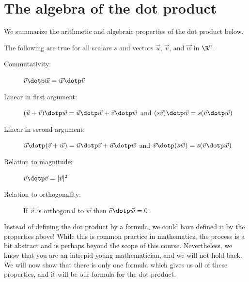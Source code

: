 \documentclass{ximera}
\begin{document}
\begin{example}
\begin{explanation}
\begin{image}
    \end{image}
\end{explanation}
\end{example}






\section{The algebra of the dot product}

We summarize the arithmetic and algebraic properties of the dot
product below.
\begin{theorem}
  The following are true for all scalars $s$ and vectors
  $\vec{u}$, $\vec{v}$, and $\vec{w}$ in $\R^n$.
  \begin{description}
  \item[Commutativity:] $\vec{v} \dotp \vec{w} = \vec{w} \dotp
    \vec{v}$
  \item[Linear in first argument:] $(\vec{u}+\vec{v})\dotp \vec{w} = \vec{u}\dotp \vec{w} +
    \vec{v}\dotp \vec{w}$ and $(s\vec{v})\dotp \vec{w} = s(\vec{v}
    \dotp \vec{w})$
  \item[Linear in second argument:] $\vec{u} \dotp (\vec{v}+\vec{w}) = \vec{u}\dotp \vec{v}+
    \vec{u}\dotp \vec{w}$ and $\vec{v} \dotp (s\vec{w}) = s(\vec{v}
    \dotp \vec{w})$
  \item[Relation to magnitude:] $\vec{v} \dotp \vec{v} = |\vec{v}|^2$
  \item[Relation to orthogonality:] If $\vec{v}$ is orthogonal to
    $\vec{w}$ then $\vec{v} \dotp \vec{w} = 0$.
  \end{description}
\end{theorem}

Instead of defining the dot product by a formula, we could have
defined it by the properties above!  While this is common practice in
mathematics, the process is a bit abstract and is perhaps beyond the scope of
this course. Nevertheless, we know that you are an intrepid young
mathematician, and we will not hold back.  We will now show that there
is only one formula which gives us all of these properties, and it
will be our formula for the dot product.
\end{document}
